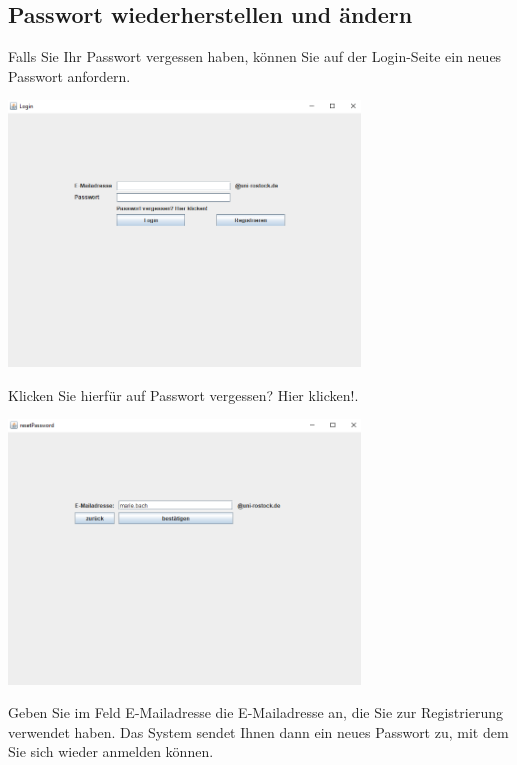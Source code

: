 \documentclass{Handbuch}
\begin{document}
\subsection{Passwort wiederherstellen und ändern}
Falls Sie Ihr Passwort vergessen haben, können Sie auf der Login-Seite ein neues Passwort anfordern.
\begin{center}
	\includegraphics[width=0.7\textwidth]{img_DozentenGUI_06.png}
\end{center}
 Klicken Sie hierfür auf \frqq Passwort vergessen? Hier klicken!\flqq. 
 \begin{center}
	\includegraphics[width=0.7\textwidth]{img_DozentenGUI_07.png}
\end{center}
Geben Sie im Feld \glqq E-Mailadresse\grqq{} die E-Mailadresse an, die Sie zur Registrierung verwendet haben. Das System sendet Ihnen dann ein neues Passwort zu, mit dem Sie sich wieder anmelden können.
\end{document}
